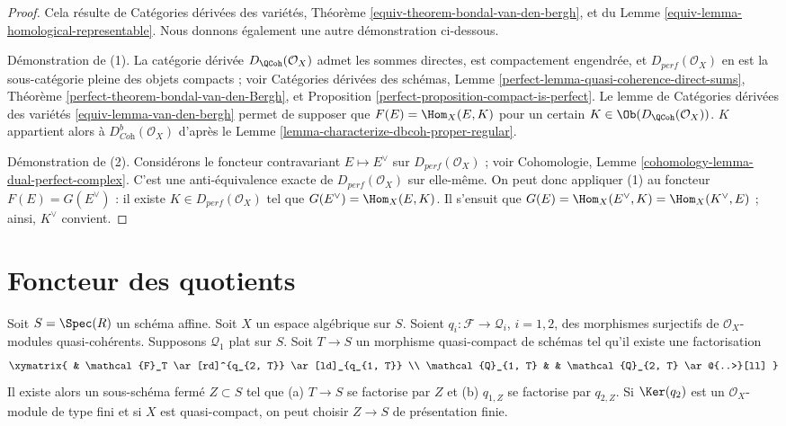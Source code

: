 \begin{proof}
Cela résulte de Catégories dérivées des variétés, Théorème
\ref{equiv-theorem-bondal-van-den-bergh}, et du
Lemme \ref{equiv-lemma-homological-representable}.
Nous donnons également une autre démonstration ci-dessous.

\medskip\noindent
Démonstration de (1). La catégorie dérivée $D_\QCoh(\mathcal{O}_X)$ admet les
sommes directes, est compactement engendrée, et
$D_{perf}(\mathcal{O}_X)$ en est la sous-catégorie pleine des objets compacts ;
voir Catégories dérivées des schémas, Lemme
\ref{perfect-lemma-quasi-coherence-direct-sums},
Théorème \ref{perfect-theorem-bondal-van-den-Bergh}, et
Proposition \ref{perfect-proposition-compact-is-perfect}.
Le lemme de Catégories dérivées des variétés
\ref{equiv-lemma-van-den-bergh} permet de supposer que
$F(E) = \Hom_X(E, K)$ pour un certain
$K \in \Ob(D_\QCoh(\mathcal{O}_X))$.
$K$ appartient alors à $D^b_{\textit{Coh}}(\mathcal{O}_X)$ d'après le
Lemme \ref{lemma-characterize-dbcoh-proper-regular}.

\medskip\noindent
Démonstration de (2). Considérons le foncteur contravariant
$E \mapsto E^\vee$ sur $D_{perf}(\mathcal{O}_X)$ ; voir
Cohomologie, Lemme \ref{cohomology-lemma-dual-perfect-complex}.
C'est une anti-équivalence exacte de $D_{perf}(\mathcal{O}_X)$ sur elle-même.
On peut donc appliquer (1) au foncteur $F(E) = G(E^\vee)$ : il existe
$K \in D_{perf}(\mathcal{O}_X)$ tel que
$G(E^\vee) = \Hom_X(E, K)$.
Il s'ensuit que $G(E) = \Hom_X(E^\vee, K) = \Hom_X(K^\vee, E)$ ;
ainsi, $K^\vee$ convient.
\end{proof}








\section{Foncteur des quotients}
\label{section-quotients}

\begin{lemma}
\label{lemma-factors-through-quotient}
Soit $S = \Spec(R)$ un sch\'ema affine. Soit $X$ un espace alg\'ebrique sur
$S$. Soient $q_i : \mathcal{F} \to \mathcal{Q}_i$, $i = 1, 2$,
des morphismes surjectifs de $\mathcal{O}_X$-modules quasi-coh\'erents.
Supposons $\mathcal{Q}_1$ plat sur $S$. Soit $T \to S$ un morphisme quasi-compact
de sch\'emas tel qu'il existe une factorisation
$$
\xymatrix{
& \mathcal{F}_T \ar[rd]^{q_{2, T}} \ar[ld]_{q_{1, T}} \\
\mathcal{Q}_{1, T} & & \mathcal{Q}_{2, T} \ar@{..>}[ll]
}
$$
Il existe alors un sous-sch\'ema ferm\'e $Z \subset S$ tel que
(a) $T \to S$ se factorise par $Z$ et (b)
$q_{1, Z}$ se factorise par $q_{2, Z}$.
Si $\Ker(q_2)$ est un $\mathcal{O}_X$-module de type fini et si $X$
est quasi-compact, on peut choisir $Z \to S$ de pr\'esentation finie.
\end{lemma}

